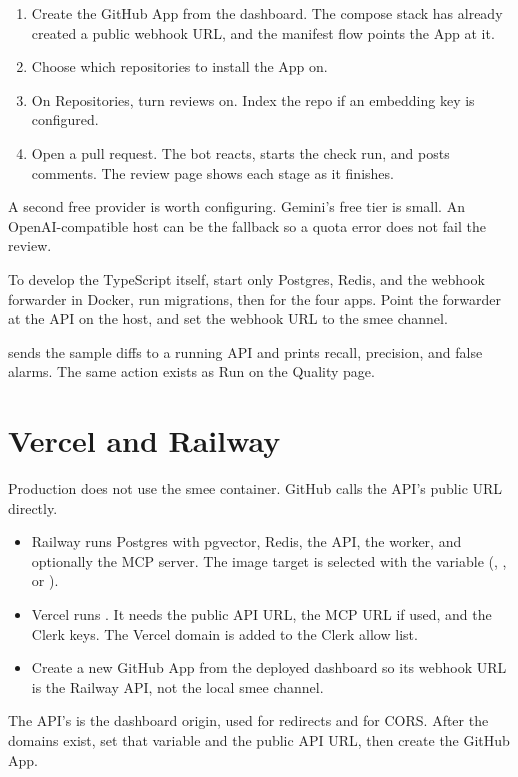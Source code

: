 \begin{enumerate}
  \item Create the GitHub App from the dashboard. The compose stack has already created a public webhook URL, and the manifest flow points the App at it.
  \item Choose which repositories to install the App on.
  \item On Repositories, turn reviews on. Index the repo if an embedding key is configured.
  \item Open a pull request. The bot reacts, starts the check run, and posts comments. The review page shows each stage as it finishes.
\end{enumerate}

A second free provider is worth configuring. Gemini's free tier is small. An OpenAI-compatible host can be the fallback so a quota error does not fail the review.

To develop the TypeScript itself, start only Postgres, Redis, and the webhook forwarder in Docker, run migrations, then  for the four apps. Point the forwarder at the API on the host, and set the webhook URL to the smee channel.

 sends the sample diffs to a running API and prints recall, precision, and false alarms. The same action exists as Run on the Quality page.

\section{Vercel and Railway}

Production does not use the smee container. GitHub calls the API's public URL directly.

\begin{itemize}
  \item Railway runs Postgres with pgvector, Redis, the API, the worker, and optionally the MCP server. The image target is selected with the  variable (, , or ).
  \item Vercel runs . It needs the public API URL, the MCP URL if used, and the Clerk keys. The Vercel domain is added to the Clerk allow list.
  \item Create a new GitHub App from the deployed dashboard so its webhook URL is the Railway API, not the local smee channel.
\end{itemize}

The API's  is the dashboard origin, used for redirects and for CORS. After the domains exist, set that variable and the public API URL, then create the GitHub App.

